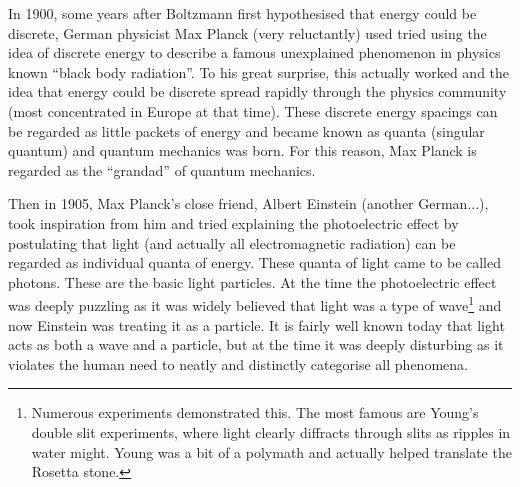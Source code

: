 \documentclass{article}
\begin{document}
In 1900, some years after Boltzmann first hypothesised that energy could be discrete, German physicist Max Planck (very reluctantly) used tried using the idea of discrete energy to describe a famous unexplained phenomenon in physics known ``black body radiation''. To his great surprise, this actually worked and the idea that energy could be discrete spread rapidly through the physics community (most concentrated in Europe at that time). These discrete energy spacings can be regarded as little packets of energy and became known as quanta (singular quantum) and quantum mechanics was born. For this reason, Max Planck is regarded as the ``grandad'' of quantum mechanics.

Then in 1905, Max Planck's close friend, Albert Einstein (another German...), took inspiration from him and tried explaining the photoelectric effect by postulating that light (and actually all electromagnetic radiation) can be regarded as individual quanta of energy. These quanta of light came to be called photons. These are the basic light particles. At the time the photoelectric effect was deeply puzzling as it was widely believed that light was a type of wave\footnote{Numerous experiments demonstrated this. The most famous are Young's double slit experiments, where light clearly diffracts through slits as ripples in water might. Young was a bit of a polymath and actually helped translate the Rosetta stone.} and now Einstein was treating it as a particle. It is fairly well known today that light acts as both a wave and a particle, but at the time it was deeply disturbing as it violates the human need to neatly and distinctly categorise all phenomena.
\end{document}
